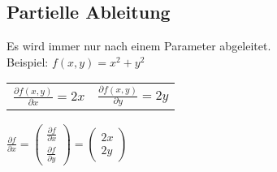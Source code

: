 \documentclass[a4paper, 11pt]{article}
\begin{document}
\subsection{Partielle Ableitung}
Es wird immer nur nach einem Parameter abgeleitet.\\
Beispiel: $f(x,y)= x^2 + y^2$ \\
\newline \begin{tabular}{l r}
	$\frac{\partial f(x,y)}{\partial x}= 2x$ & $\frac{\partial f(x,y)}{\partial 
	y}=2y$\\
\end{tabular}

$\frac{\partial f}{\partial x} = 
\begin{pmatrix}
	\frac{\partial f}{\partial x} \\ 
	\frac{\partial f}{\partial y}
\end{pmatrix}
= 
\begin{pmatrix}
	2x\\
	2y
\end{pmatrix}$ \newline
\newpage
\end{document}
